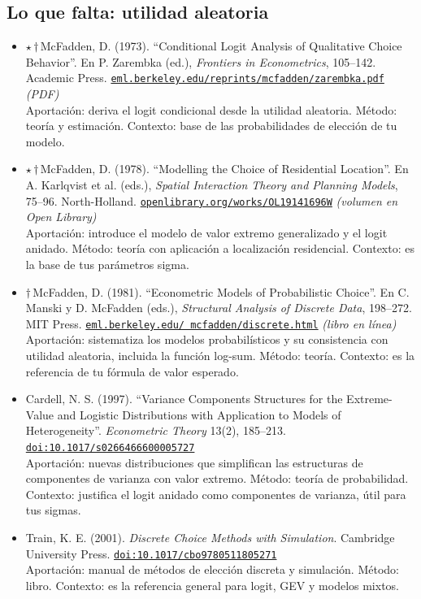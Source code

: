 \documentclass[11pt]{article}
\begin{document}
\subsection*{Lo que falta: utilidad aleatoria}
\begin{itemize}
\item $\star$\,$\dagger$\,McFadden, D. (1973). ``Conditional Logit Analysis of Qualitative Choice Behavior''. En P. Zarembka (ed.), \textit{Frontiers in Econometrics}, 105--142. Academic Press. \href{https://eml.berkeley.edu/reprints/mcfadden/zarembka.pdf}{\texttt{eml.berkeley.edu/reprints/mcfadden/zarembka.pdf}} \textit{(PDF)}\\
Aportación: deriva el logit condicional desde la utilidad aleatoria. Método: teoría y estimación. Contexto: base de las probabilidades de elección de tu modelo.
\item $\star$\,$\dagger$\,McFadden, D. (1978). ``Modelling the Choice of Residential Location''. En A. Karlqvist et al. (eds.), \textit{Spatial Interaction Theory and Planning Models}, 75--96. North-Holland. \href{https://openlibrary.org/works/OL19141696W}{\texttt{openlibrary.org/works/OL19141696W}} \textit{(volumen en Open Library)}\\
Aportación: introduce el modelo de valor extremo generalizado y el logit anidado. Método: teoría con aplicación a localización residencial. Contexto: es la base de tus parámetros sigma.
\item $\dagger$\,McFadden, D. (1981). ``Econometric Models of Probabilistic Choice''. En C. Manski y D. McFadden (eds.), \textit{Structural Analysis of Discrete Data}, 198--272. MIT Press. \href{https://eml.berkeley.edu/~mcfadden/discrete.html}{\texttt{eml.berkeley.edu/~mcfadden/discrete.html}} \textit{(libro en línea)}\\
Aportación: sistematiza los modelos probabilísticos y su consistencia con utilidad aleatoria, incluida la función log-sum. Método: teoría. Contexto: es la referencia de tu fórmula de valor esperado.
\item Cardell, N. S. (1997). ``Variance Components Structures for the Extreme-Value and Logistic Distributions with Application to Models of Heterogeneity''. \textit{Econometric Theory} 13(2), 185--213. \href{https://doi.org/10.1017/s0266466600005727}{\texttt{doi:10.1017/s0266466600005727}}\\
Aportación: nuevas distribuciones que simplifican las estructuras de componentes de varianza con valor extremo. Método: teoría de probabilidad. Contexto: justifica el logit anidado como componentes de varianza, útil para tus sigmas.
\item Train, K. E. (2001). \textit{Discrete Choice Methods with Simulation}. Cambridge University Press. \href{https://doi.org/10.1017/cbo9780511805271}{\texttt{doi:10.1017/cbo9780511805271}}\\
Aportación: manual de métodos de elección discreta y simulación. Método: libro. Contexto: es la referencia general para logit, GEV y modelos mixtos.
\end{itemize}
\end{document}
